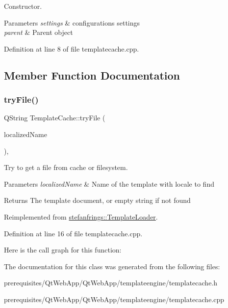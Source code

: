 Constructor. 
\begin{DoxyParams}{Parameters}
{\em settings} & configurations settings \\
\hline
{\em parent} & Parent object \\
\hline
\end{DoxyParams}


Definition at line 8 of file templatecache.\+cpp.



\subsection{Member Function Documentation}
\mbox{\label{classstefanfrings_1_1_template_cache_a65584abe7d62c93659c741f41bdeeada}} 
\subsubsection{\texorpdfstring{try\+File()}{tryFile()}}
{\footnotesize\ttfamily Q\+String Template\+Cache\+::try\+File (\begin{DoxyParamCaption}\item[{Q\+String}]{localized\+Name }\end{DoxyParamCaption})\hspace{0.3cm}{\ttfamily [protected]}, {\ttfamily [virtual]}}

Try to get a file from cache or filesystem. 
\begin{DoxyParams}{Parameters}
{\em localized\+Name} & Name of the template with locale to find \\
\hline
\end{DoxyParams}
\begin{DoxyReturn}{Returns}
The template document, or empty string if not found 
\end{DoxyReturn}


Reimplemented from \mbox{\hyperlink{classstefanfrings_1_1_template_loader_a006cbda0c014ad08199563ea56fc05a3}{stefanfrings\+::\+Template\+Loader}}.



Definition at line 16 of file templatecache.\+cpp.

Here is the call graph for this function\+:


The documentation for this class was generated from the following files\+:\begin{DoxyCompactItemize}
\item 
prerequisites/\+Qt\+Web\+App/\+Qt\+Web\+App/templateengine/templatecache.\+h\item 
prerequisites/\+Qt\+Web\+App/\+Qt\+Web\+App/templateengine/templatecache.\+cpp\end{DoxyCompactItemize}

